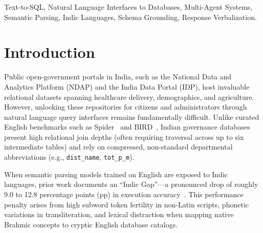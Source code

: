 \documentclass[conference]{IEEEtran}
\begin{document}
\begin{IEEEkeywords}
Text-to-SQL, Natural Language Interfaces to Databases, Multi-Agent Systems, Semantic Parsing, Indic Languages, Schema Grounding, Response Verbalization.
\end{IEEEkeywords}

\section{Introduction}\label{sec:intro}
Public open-government portals in India, such as the National Data and Analytics Platform (NDAP) and the India Data Portal (IDP), host invaluable relational datasets spanning healthcare delivery, demographics, and agriculture. However, unlocking these repositories for citizens and administrators through natural language query interfaces remains fundamentally difficult. Unlike curated English benchmarks such as Spider~\cite{yu2018spider} and BIRD~\cite{li2023bird}, Indian governance databases present high relational join depths (often requiring traversal across up to six intermediate tables) and rely on compressed, non-standard departmental abbreviations (e.g., \texttt{dist\_name}, \texttt{tot\_p\_m}).

When semantic parsing models trained on English are exposed to Indic languages, prior work documents an ``Indic Gap''---a pronounced drop of roughly 9.0 to 12.8 percentage points (pp) in execution accuracy~\cite{dou2022multispider, dawar2026indicdbbench}. This performance penalty arises from high subword token fertility in non-Latin scripts, phonetic variations in transliteration, and lexical distraction when mapping native Brahmic concepts to cryptic English database catalogs.
\end{document}
